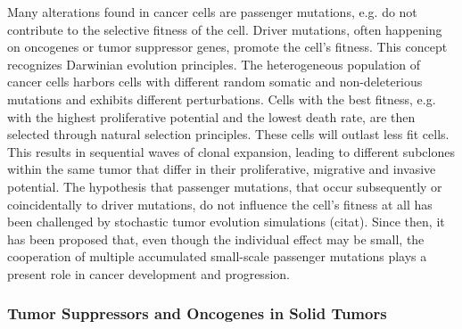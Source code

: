       Many alterations found in cancer cells are passenger mutations, e.g. do not
      contribute to the selective fitness of the cell. Driver mutations, often
      happening on oncogenes or tumor suppressor genes, promote the cell's
      fitness. This concept recognizes Darwinian evolution principles. The
      heterogeneous  population of cancer cells harbors cells with different
      random somatic and non-deleterious mutations and exhibits different
      perturbations. Cells with the best fitness, e.g. with the highest
      proliferative potential  and the lowest death rate, are then selected
      through natural selection principles. These cells will outlast less fit
      cells. This results in  sequential waves of clonal expansion, leading to
      different subclones within the same tumor that differ in their
      proliferative, migrative and invasive potential. The hypothesis that
      passenger mutations, that occur subsequently or coincidentally to driver
      mutations, do not influence the cell's fitness at all has been
      challenged by stochastic tumor evolution simulations (citat). Since then,
      it has been proposed that, even though the individual effect may be
      small, the cooperation of multiple accumulated small-scale passenger
      mutations plays a present role in cancer development and progression.

    \subsubsection{Tumor Suppressors and Oncogenes in Solid Tumors}

